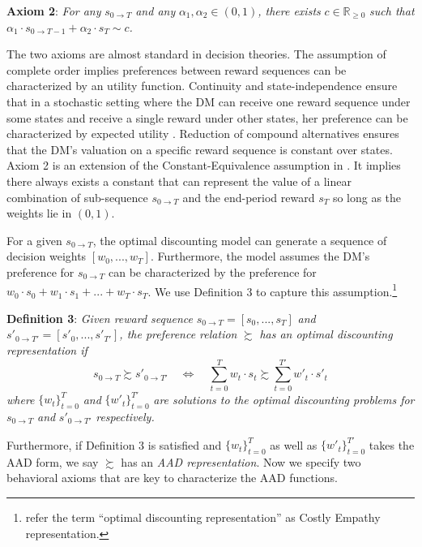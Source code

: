 \documentclass[
  12pt,
]{article}
\begin{document}
\noindent \textbf{Axiom 2}: \emph{For any} \(s_{0\rightarrow T}\)
\emph{and any} \(\alpha_1,\alpha_2 \in (0,1)\)\emph{, there exists}
\(c\in \mathbb{R}_{\geq 0}\) \emph{such that}
\(\alpha_1 \cdot s_{0\rightarrow T-1}+\alpha_2\cdot s_T \sim c\)\emph{.}

The two axioms are almost standard in decision theories. The assumption
of complete order implies preferences between reward sequences can be
characterized by an utility function. Continuity and state-independence
ensure that in a stochastic setting where the DM can receive one reward
sequence under some states and receive a single reward under other
states, her preference can be characterized by expected utility
\citep{herstein1953axiomatic}. Reduction of compound alternatives
ensures that the DM's valuation on a specific reward sequence is
constant over states. Axiom 2 is an extension of the
Constant-Equivalence assumption in \citet{bleichrodt2008koopmans}. It
implies there always exists a constant that can represent the value of a
linear combination of sub-sequence \(s_{0\rightarrow T}\) and the
end-period reward \(s_T\) so long as the weights lie in \((0,1)\).

For a given \(s_{0\rightarrow T}\), the optimal discounting model can
generate a sequence of decision weights \([w_0,...,w_T]\). Furthermore,
the model assumes the DM's preference for \(s_{0\rightarrow T}\) can be
characterized by the preference for
\(w_0\cdot s_0+w_1\cdot s_1 +...+w_T\cdot s_T\). We use Definition 3 to
capture this assumption.\footnote{\citet{noor2022optimal} refer the term
  ``optimal discounting representation'' as Costly Empathy
  representation.}

\noindent \textbf{Definition 3}: \emph{Given reward sequence}
\(s_{0\rightarrow T}=[s_0,...,s_T]\) \emph{and}
\(s'_{0\rightarrow T'}=[s'_0,...,s'_{T'}]\)\emph{, the preference
relation} \(\succsim\) \emph{has an optimal discounting representation
if} \[
s_{0\rightarrow T} \succsim s'_{0\rightarrow T'}\quad
\Longleftrightarrow \quad \sum_{t=0}^T w_t\cdot s_t
\succsim \sum_{t=0}^{T'} w'_t \cdot s'_t
\] \emph{where} \(\{w_t\}_{t=0}^T\) \emph{and} \(\{w'_t\}^{T'}_{t=0}\)
\emph{are solutions to the optimal discounting problems for}
\(s_{0\rightarrow T}\) \emph{and} \(s'_{0\rightarrow T'}\)
\emph{respectively.}

Furthermore, if Definition 3 is satisfied and \(\{w_t\}_{t=0}^T\) as
well as \(\{w'_t\}^{T'}_{t=0}\) takes the AAD form, we say \(\succsim\)
has an \emph{AAD representation}. Now we specify two behavioral axioms
that are key to characterize the AAD functions.
\end{document}
